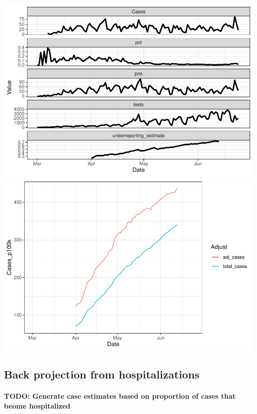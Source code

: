 \documentclass[
]{article}
\begin{document}
\includegraphics{Testing_Writeup_files/figure-latex/sf_case_adjust_underreporting-1.pdf}
\includegraphics{Testing_Writeup_files/figure-latex/sf_case_adjust_underreporting-2.pdf}

\hypertarget{back-projection-from-hospitalizations}{%
\subsection{Back projection from
hospitalizations}\label{back-projection-from-hospitalizations}}

\hypertarget{todo-generate-case-estimates-based-on-proportion-of-cases-that-beome-hospitalized}{%
\paragraph{TODO: Generate case estimates based on proportion of cases
that beome
hospitalized}\label{todo-generate-case-estimates-based-on-proportion-of-cases-that-beome-hospitalized}}
\end{document}
